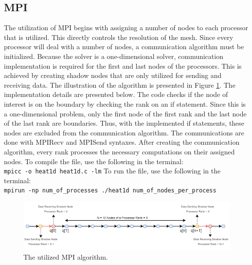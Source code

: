 \documentclass[12pt]{article}
\begin{document}
\subsection{MPI}
The utilization of MPI begins with assigning a number of nodes to each processor that is utilized. This directly controls the resolution of the mesh. Since every processor will deal with a number of nodes, a communication algorithm must be initialized. Because the solver is a one-dimensional solver, communication implementation is required for the first and last nodes of the processors. This is achieved by creating shadow nodes that are only utilized for sending and receiving data. The illustration of the algorithm is presented in Figure \ref{fig:1}. The implementation details are presented below. The code checks if the node of interest is on the boundary by checking the rank on an if statement. Since this is a one-dimensional problem, only the first node of the first rank and the last node of the last rank are boundaries. Thus, with the implemented if statements, these nodes are excluded from the communication algorithm. The communications are done with MPI\textunderscore{}Recv and MPI\textunderscore{}Send syntaxes. After creating the communication algorithm, every rank processes the necessary computations on their assigned nodes.
To compile the file, use the following in the terminal:\\
\texttt{mpicc -o heat1d heat1d.c -lm}
To run the file, use the following in the terminal:\\
\texttt{mpirun -np num\_of\_processes ./heat1d num\_of\_nodes\_per\_process}\\

\begin{figure}[H]
\centering
\includegraphics[width=\textwidth]{mpi_algo.png}
\caption{The utilized MPI algorithm.}
\label{fig:1}
\end{figure}
\end{document}

